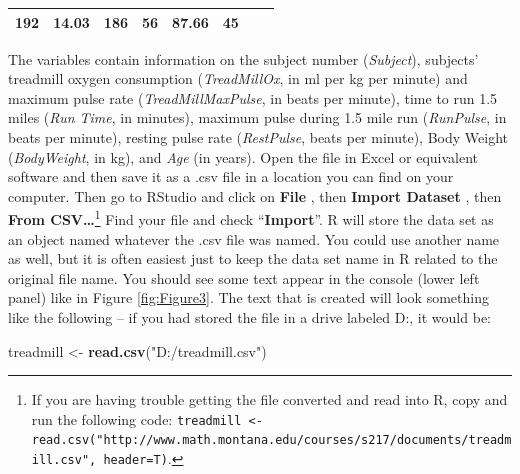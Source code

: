\documentclass[]{article}
\newenvironment{Shaded}{\begin{snugshade}}{\end{snugshade}}
\newcommand{\KeywordTok}[1]{\textcolor[rgb]{0.13,0.29,0.53}{\textbf{{#1}}}}
\newcommand{\StringTok}[1]{\textcolor[rgb]{0.31,0.60,0.02}{{#1}}}
\newcommand{\NormalTok}[1]{{#1}}
\let\rmarkdownfootnote\footnote%
\def\footnote{\protect\rmarkdownfootnote}
\begin{document}
\begin{longtable}[]{@{}lllrrlrr@{}}
\begin{minipage}[t]{0.14\columnwidth}
192\strut
\end{minipage} & \begin{minipage}[t]{0.09\columnwidth}\raggedleft\strut
14.03\strut
\end{minipage} & \begin{minipage}[t]{0.10\columnwidth}\raggedleft\strut
186\strut
\end{minipage} & \begin{minipage}[t]{0.08\columnwidth}\raggedright\strut
56\strut
\end{minipage} & \begin{minipage}[t]{0.15\columnwidth}\raggedleft\strut
87.66\strut
\end{minipage} & \begin{minipage}[t]{0.04\columnwidth}\raggedleft\strut
45\strut
\end{minipage}\tabularnewline
\bottomrule
\end{longtable}

The variables contain information on the subject number
(\emph{Subject}), subjects' treadmill oxygen consumption
(\emph{TreadMillOx}, in ml per kg per minute) and maximum pulse rate
(\emph{TreadMillMaxPulse}, in beats per minute), time to run 1.5 miles
(\emph{Run Time}, in minutes), maximum pulse during 1.5 mile run
(\emph{RunPulse}, in beats per minute), resting pulse rate
(\emph{RestPulse}, beats per minute), Body Weight (\emph{BodyWeight}, in
kg), and \emph{Age} (in years). Open the file in Excel or equivalent
software and then save it as a .csv file in a location you can find on
your computer. Then go to RStudio and click on \textbf{File} , then
\textbf{Import Dataset} , then \textbf{From CSV\ldots{}}\footnote{If you
  are having trouble getting the file converted and read into R, copy
  and run the following code:
  \texttt{treadmill\ \textless{}-read.csv("http://www.math.montana.edu/courses/s217/documents/treadmill.csv",\ header=T)}.}
Find your file and check ``\textbf{Import}''. R will store the data set
as an object named whatever the .csv file was named. You could use
another name as well, but it is often easiest just to keep the data set
name in R related to the original file name. You should see some text
appear in the console (lower left panel) like in Figure
\ref{fig:Figure3}. The text that is created will look something like the
following -- if you had stored the file in a drive labeled D:, it would
be:

\begin{Shaded}
\begin{Highlighting}[]
\NormalTok{treadmill <-}\StringTok{ }\KeywordTok{read.csv}\NormalTok{(}\StringTok{"D:/treadmill.csv"}\NormalTok{)}
\end{Highlighting}
\end{Shaded}
\end{document}
